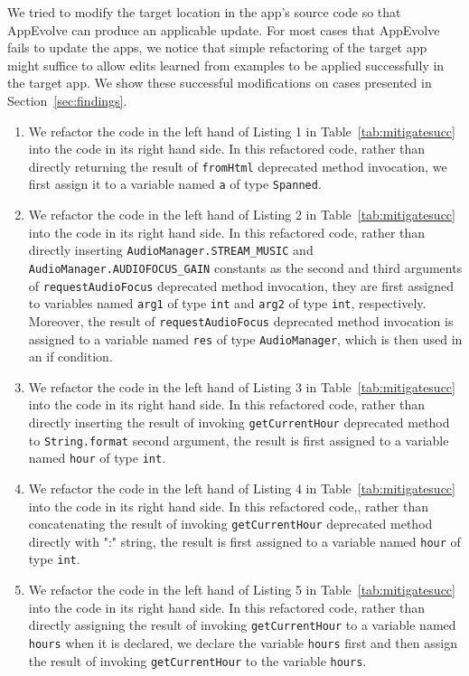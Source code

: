 We tried to modify the target location in the app's source code so that AppEvolve can produce an applicable update. For most cases that AppEvolve fails to update the apps, we notice that simple refactoring of the target app might suffice to allow edits learned from examples to be applied successfully in the target app. We show these successful modifications on cases presented in Section~\ref{sec:findings}.
\begin{enumerate}
\item We refactor the code in the left hand of Listing 1 in Table~\ref{tab:mitigatesucc} into the code in its right hand side. In this refactored code, rather than directly returning the result of {\tt fromHtml} deprecated method invocation, we first assign it to a variable named {\tt a} of type {\tt Spanned}. %

\item We refactor the code in the left hand of Listing 2 in Table~\ref{tab:mitigatesucc} into the code in its right hand side. In this refactored code, rather than directly inserting {\tt AudioManager.STREAM\_MUSIC} and {\tt AudioManager.AUDIOFOCUS\_GAIN} constants as the second and third arguments of {\tt requestAudioFocus} deprecated method invocation, they are first assigned to variables named {\tt arg1} of type {\tt int} and {\tt arg2} of type {\tt int}, respectively. Moreover, the result of {\tt requestAudioFocus} deprecated method invocation is assigned to a variable  named {\tt res} of type {\tt AudioManager}, which is then used in an if condition.

\item We refactor the code in the left hand of Listing 3 in  Table~\ref{tab:mitigatesucc} into the code in its right hand side. In this refactored code, rather than directly inserting the result of invoking {\tt getCurrentHour} deprecated method to {\tt String.format} second argument, the result is first assigned to a variable named {\tt hour} of type {\tt int}.

\item We refactor the code in the left hand of Listing 4 in  Table~\ref{tab:mitigatesucc} into the code in its right hand side. In this refactored code,, rather than concatenating the result of invoking {\tt getCurrentHour} deprecated method directly with ":" string, the result is first assigned to a variable named {\tt hour} of type {\tt int}.

\item We refactor the code in the left hand of Listing 5 in  Table~\ref{tab:mitigatesucc} into the code in its right hand side. In this refactored code, rather than directly assigning the result of invoking {\tt getCurrentHour} to a variable named {\tt hours} when it is declared, we declare the variable {\tt hours} first and then assign the result of invoking {\tt getCurrentHour} to the variable {\tt hours}.


\end{enumerate}
